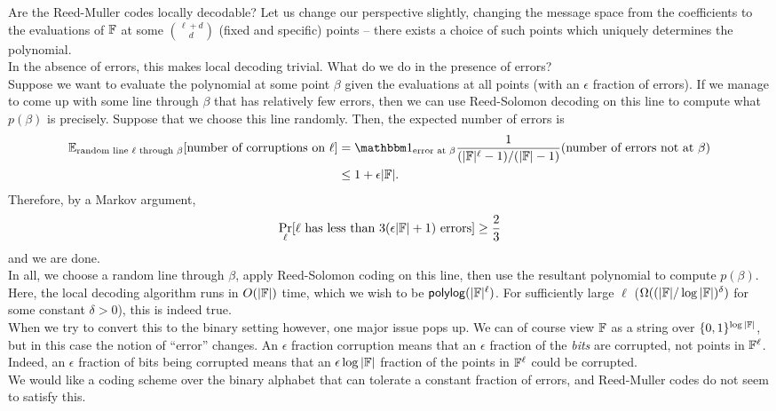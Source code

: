 		Are the Reed-Muller codes locally decodable? Let us change our perspective slightly, changing the message space from the coefficients to the evaluations of $\mathbb{F}$ at some $\binom{\ell+d}{d}$ (fixed and specific) points -- there exists a choice of such points which uniquely determines the polynomial.\\
		In the absence of errors, this makes local decoding trivial. What do we do in the presence of errors?\\
		Suppose we want to evaluate the polynomial at some point $\beta$ given the evaluations at all points (with an $\epsilon$ fraction of errors). If we manage to come up with some line through $\beta$ that has relatively few errors, then we can use Reed-Solomon decoding on this line to compute what $p(\beta)$ is precisely. Suppose that we choose this line randomly. Then, the expected number of errors is
		\begin{align*}
			\E_{\text{random line $\ell$ through $\beta$}}[\text{number of corruptions on $\ell$}] &= \indic_{\text{error at $\beta$}} \frac{1}{(|\F|^\ell-1)/(|\F|-1)} (\text{number of errors not at $\beta$}) \\
				&\le 1 + \epsilon|\F|.
		\end{align*}
		Therefore, by a Markov argument,
		\[ \Pr_{\ell} [\text{$\ell$ has less than $3(\epsilon|\mathbb{F}|+1)$ errors}] \ge \frac{2}{3} \]
		and we are done.\\

		In all, we choose a random line through $\beta$, apply Reed-Solomon coding on this line, then use the resultant polynomial to compute $p(\beta)$.\\
		Here, the local decoding algorithm runs in $O(|\mathbb{F}|)$ time, which we wish to be $\mathsf{polylog}(|\mathbb{F}|^{\ell})$. For sufficiently large $\ell$ ($\Omega( (|\mathbb{F}|/\log|\mathbb{F}|)^\delta)$ for some constant $\delta > 0$), this is indeed true.\\

		When we try to convert this to the binary setting however, one major issue pops up. We can of course view $\mathbb{F}$ as a string over $\{0,1\}^{\log |\mathbb{F}|}$, but in this case the notion of ``error'' changes. An $\epsilon$ fraction corruption means that an $\epsilon$ fraction of the \emph{bits} are corrupted, not points in $\mathbb{F}^\ell$. Indeed, an $\epsilon$ fraction of bits being corrupted means that an $\epsilon \log|\mathbb{F}|$ fraction of the points in $\mathbb{F}^\ell$ could be corrupted. \\
		We would like a coding scheme over the binary alphabet that can tolerate a constant fraction of errors, and Reed-Muller codes do not seem to satisfy this.

